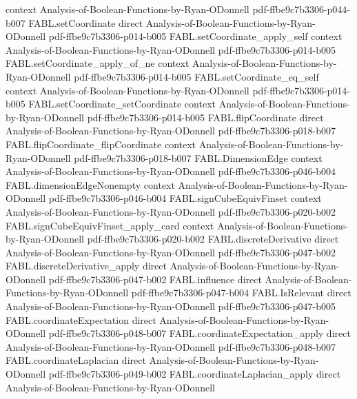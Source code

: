 \begin{theorem}
  {context}
  {Analysis-of-Boolean-Functions-by-Ryan-ODonnell}
  {pdf-ffbe9c7b3306-p044-b007}
\proofstep
  {FABL.setCoordinate}
  {direct}
  {Analysis-of-Boolean-Functions-by-Ryan-ODonnell}
  {pdf-ffbe9c7b3306-p014-b005}
\proofstep
  {FABL.setCoordinate_apply_self}
  {context}
  {Analysis-of-Boolean-Functions-by-Ryan-ODonnell}
  {pdf-ffbe9c7b3306-p014-b005}
\proofstep
  {FABL.setCoordinate_apply_of_ne}
  {context}
  {Analysis-of-Boolean-Functions-by-Ryan-ODonnell}
  {pdf-ffbe9c7b3306-p014-b005}
\proofstep
  {FABL.setCoordinate_eq_self}
  {context}
  {Analysis-of-Boolean-Functions-by-Ryan-ODonnell}
  {pdf-ffbe9c7b3306-p014-b005}
\proofstep
  {FABL.setCoordinate_setCoordinate}
  {context}
  {Analysis-of-Boolean-Functions-by-Ryan-ODonnell}
  {pdf-ffbe9c7b3306-p014-b005}
\proofstep
  {FABL.flipCoordinate}
  {direct}
  {Analysis-of-Boolean-Functions-by-Ryan-ODonnell}
  {pdf-ffbe9c7b3306-p018-b007}
\proofstep
  {FABL.flipCoordinate_flipCoordinate}
  {context}
  {Analysis-of-Boolean-Functions-by-Ryan-ODonnell}
  {pdf-ffbe9c7b3306-p018-b007}
\proofstep
  {FABL.DimensionEdge}
  {context}
  {Analysis-of-Boolean-Functions-by-Ryan-ODonnell}
  {pdf-ffbe9c7b3306-p046-b004}
\proofstep
  {FABL.dimensionEdgeNonempty}
  {context}
  {Analysis-of-Boolean-Functions-by-Ryan-ODonnell}
  {pdf-ffbe9c7b3306-p046-b004}
\proofstep
  {FABL.signCubeEquivFinset}
  {context}
  {Analysis-of-Boolean-Functions-by-Ryan-ODonnell}
  {pdf-ffbe9c7b3306-p020-b002}
\proofstep
  {FABL.signCubeEquivFinset_apply_card}
  {context}
  {Analysis-of-Boolean-Functions-by-Ryan-ODonnell}
  {pdf-ffbe9c7b3306-p020-b002}
\proofstep
  {FABL.discreteDerivative}
  {direct}
  {Analysis-of-Boolean-Functions-by-Ryan-ODonnell}
  {pdf-ffbe9c7b3306-p047-b002}
\proofstep
  {FABL.discreteDerivative_apply}
  {direct}
  {Analysis-of-Boolean-Functions-by-Ryan-ODonnell}
  {pdf-ffbe9c7b3306-p047-b002}
\proofstep
  {FABL.influence}
  {direct}
  {Analysis-of-Boolean-Functions-by-Ryan-ODonnell}
  {pdf-ffbe9c7b3306-p047-b004}
\proofstep
  {FABL.IsRelevant}
  {direct}
  {Analysis-of-Boolean-Functions-by-Ryan-ODonnell}
  {pdf-ffbe9c7b3306-p047-b005}
\proofstep
  {FABL.coordinateExpectation}
  {direct}
  {Analysis-of-Boolean-Functions-by-Ryan-ODonnell}
  {pdf-ffbe9c7b3306-p048-b007}
\proofstep
  {FABL.coordinateExpectation_apply}
  {direct}
  {Analysis-of-Boolean-Functions-by-Ryan-ODonnell}
  {pdf-ffbe9c7b3306-p048-b007}
\proofstep
  {FABL.coordinateLaplacian}
  {direct}
  {Analysis-of-Boolean-Functions-by-Ryan-ODonnell}
  {pdf-ffbe9c7b3306-p049-b002}
\proofstep
  {FABL.coordinateLaplacian_apply}
  {direct}
  {Analysis-of-Boolean-Functions-by-Ryan-ODonnell}

\end{theorem}
